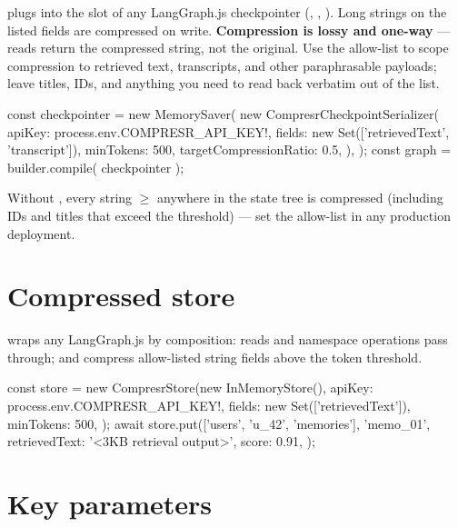\documentclass[10pt]{article}
\begin{document}
 plugs into the
 slot of any LangGraph.js checkpointer
(, ,
). Long strings on the listed fields are
compressed on write. \textbf{Compression is lossy and one-way} — reads
return the compressed string, not the original. Use the
 allow-list to scope compression to retrieved
text, transcripts, and other paraphrasable payloads; leave titles, IDs,
and anything you need to read back verbatim out of the list.

\begin{tscode}
const checkpointer = new MemorySaver(
  new CompresrCheckpointSerializer({
    apiKey:                 process.env.COMPRESR_API_KEY!,
    fields:                 new Set(['retrievedText', 'transcript']),
    minTokens:              500,
    targetCompressionRatio: 0.5,
  }),
);
const graph = builder.compile({ checkpointer });
\end{tscode}

Without , every string $\geq$
 anywhere in the state tree is compressed
(including IDs and titles that exceed the threshold) — set the allow-list
in any production deployment.

\section{Compressed store}

 wraps any LangGraph.js
 by composition: reads and namespace operations
pass through;  and  compress
allow-listed string fields above the token threshold.

\begin{tscode}
const store = new CompresrStore(new InMemoryStore(), {
  apiKey:    process.env.COMPRESR_API_KEY!,
  fields:    new Set(['retrievedText']),
  minTokens: 500,
});
await store.put(['users', 'u_42', 'memories'], 'memo_01', {
  retrievedText: '<3KB retrieval output>',
  score:         0.91,
});
\end{tscode}

\section{Key parameters}
\end{document}
